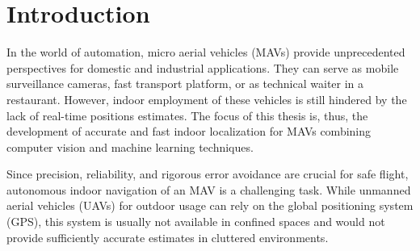 \chapter{Introduction}
\label{chap:introduction}


In the world of automation, micro aerial vehicles (MAVs) provide unprecedented perspectives for domestic and industrial applications. They can serve as mobile surveillance cameras, fast transport platform, or as technical waiter in a restaurant. However, indoor employment of these vehicles
is still hindered by the lack of real-time positions estimates. The focus of this thesis is,
thus, the development of accurate and fast indoor localization for
MAVs combining computer vision and machine learning techniques.


Since precision, reliability, and rigorous error avoidance are crucial
for safe flight, autonomous indoor navigation of an MAV is a
challenging task. While unmanned aerial vehicles (UAVs) for
outdoor usage can rely on the global positioning system (GPS), this system is
usually not available in confined spaces and would not provide
sufficiently accurate estimates in cluttered environments.